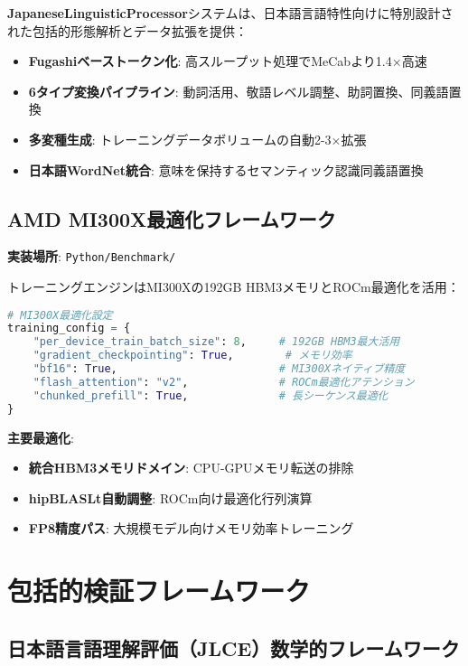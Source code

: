 \documentclass[12pt,a4paper]{article}
\begin{document}
\textbf{JapaneseLinguisticProcessor}システムは、日本語言語特性向けに特別設計された包括的形態解析とデータ拡張を提供：

\begin{itemize}
\item \textbf{Fugashiベーストークン化}: 高スループット処理でMeCabより1.4×高速
\item \textbf{6タイプ変換パイプライン}: 動詞活用、敬語レベル調整、助詞置換、同義語置換
\item \textbf{多変種生成}: トレーニングデータボリュームの自動2-3×拡張
\item \textbf{日本語WordNet統合}: 意味を保持するセマンティック認識同義語置換
\end{itemize}

\subsection{AMD MI300X最適化フレームワーク}

\textbf{実装場所}: \texttt{Python/Benchmark/}

トレーニングエンジンはMI300Xの192GB HBM3メモリとROCm最適化を活用：

\begin{lstlisting}[language=Python, caption=MI300X最適化設定]
# MI300X最適化設定
training_config = {
    "per_device_train_batch_size": 8,     # 192GB HBM3最大活用
    "gradient_checkpointing": True,        # メモリ効率
    "bf16": True,                         # MI300Xネイティブ精度
    "flash_attention": "v2",              # ROCm最適化アテンション
    "chunked_prefill": True,              # 長シーケンス最適化
}
\end{lstlisting}

\textbf{主要最適化}:

\begin{itemize}
\item \textbf{統合HBM3メモリドメイン}: CPU-GPUメモリ転送の排除
\item \textbf{hipBLASLt自動調整}: ROCm向け最適化行列演算
\item \textbf{FP8精度パス}: 大規模モデル向けメモリ効率トレーニング
\end{itemize}

\section{包括的検証フレームワーク}

\subsection{日本語言語理解評価（JLCE）数学的フレームワーク}
\end{document}
